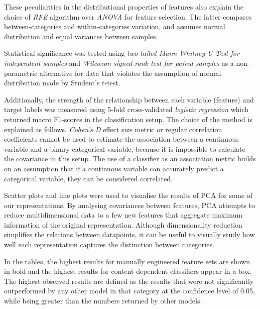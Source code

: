These peculiarities in the distributional properties of features also explain the choice of \textit{RFE} algorithm over \textit{ANOVA} for feature selection. The latter compares between-categories and within-categories variation, and assumes normal distribution and equal variances between samples.

Statistical significance was tested using \textit{two-tailed Mann-Whitney U Test for independent samples} and \textit{Wilcoxon signed-rank test for paired samples} as a non-parametric alternative for data that violates the assumption of normal distribution made by Student's t-test.

Additionally, the strength of the relationship between each variable (feature) and target labels was measured using 5-fold cross-validated \textit{logistic regression} which returned macro F1-scores in the classification setup. 
The choice of the method is explained as follows. \textit{Cohen's D} effect size metric or regular correlation coefficients cannot be used to estimate the association between a continuous variable and a binary categorical variable, because it is impossible to calculate the covariance in this setup. The use of a classifier as an association metric builds on an assumption that if a continuous variable can accurately predict a categorical variable, they can be considered correlated. 

Scatter plots and line plots were used to visualise the results of \gls{PCA} for some of our representations. By analysing covariances between features, PCA attempts to reduce multidimensional data to a few new features that aggregate maximum information of the original representation. Although dimensionality reduction simplifies the relations between datapoints, it can be useful to visually study how well each representation captures the distinction between categories. 

In the tables, the highest results for manually engineered feature sets are shown in bold and the highest results for content-dependent classifiers appear in a box. The highest observed results are defined as the results that were not significantly outperformed by any other model in that category at the confidence level of 0.05, while being greater than the numbers returned by other models. 

